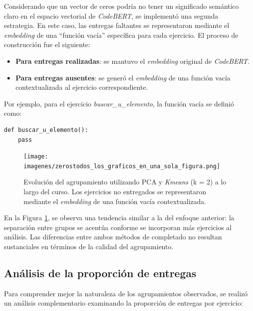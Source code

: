\documentclass[11pt,a4paper,twoside,openany]{tesis}
\begin{document}
Considerando que un vector de ceros podría no tener un significado semántico claro en el espacio vectorial de \emph{CodeBERT}, se implementó una segunda estrategia. En este caso, las entregas faltantes se representaron mediante el \emph{embedding} de una ``función vacía'' específica para cada ejercicio. El proceso de construcción fue el siguiente:

\begin{itemize}
    \item \textbf{Para entregas realizadas}: se mantuvo el \emph{embedding} original de \emph{CodeBERT}.
    \item \textbf{Para entregas ausentes}: se generó el \emph{embedding} de una función vacía contextualizada al ejercicio correspondiente.
\end{itemize}

Por ejemplo, para el ejercicio \emph{buscar\_u\_elemento}, la función vacía se definió como:

\begin{lstlisting}[style=pythonstyle]
def buscar_u_elemento():
    pass
\end{lstlisting}

\begin{figure}[H]
    \centering
    \texttt{[image: imagenes/zerostodos\_los\_graficos\_en\_una\_sola\_figura.png]}
    \caption{Evolución del agrupamiento utilizando PCA y \emph{Kmeans} (k = 2) a lo largo del curso. Los ejercicios no entregados se representaron mediante el \emph{embedding} de una función vacía contextualizada.}
    \label{fig: fill func}
\end{figure}

En la Figura \ref{fig: fill func}, se observa una tendencia similar a la del enfoque anterior: la separación entre grupos se acentúa conforme se incorporan más ejercicios al análisis. Las diferencias entre ambos métodos de completado no resultan sustanciales en términos de la calidad del agrupamiento.

\subsection{Análisis de la proporción de entregas}

Para comprender mejor la naturaleza de los agrupamientos observados, se realizó un análisis complementario examinando la proporción de entregas por ejercicio:
\end{document}
